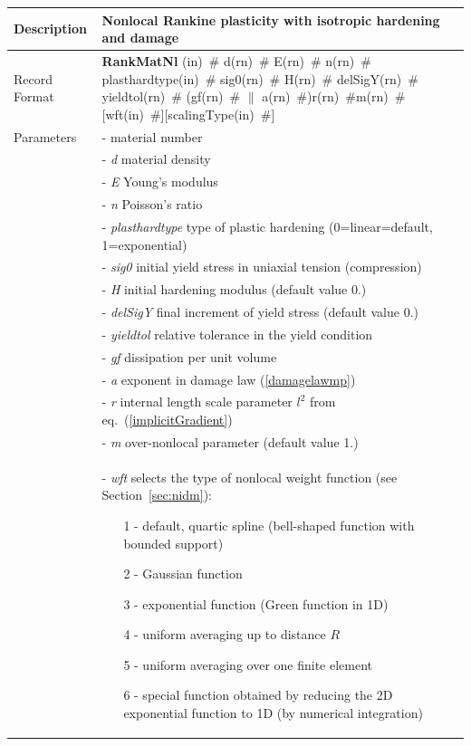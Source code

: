 \documentclass[a4paper]{article}
\newcommand{\descitem}[1]{{\noindent \bf #1}}
\newcommand{\elemparam}[2]{{{#1\tiny (#2)}~\#}}
\newcommand{\param}[1]{{\it #1}}
\newenvironment{mmt}{\begin{tabular}{|l|p{9cm}|}}{\end{tabular}\\}
\newenvironment{mmt}{\begin{tabular}{|l|l|}}{\end{tabular}\\}
\begin{document}
\begin{table}[!htb]
\begin{mmt}
\hline
Description & Nonlocal Rankine plasticity with isotropic hardening and damage\\
\hline
Record Format & \descitem{RankMatNl}  \elemparam{}{in}
\elemparam{d}{rn} \elemparam{E}{rn} \elemparam{n}{rn} \elemparam{plasthardtype}{in} \elemparam{sig0}{rn} \elemparam{H}{rn} \elemparam{delSigY}{rn} \elemparam{yieldtol}{rn} (\elemparam{gf}{rn} $\|$ \elemparam{a}{rn})\elemparam{r}{rn}\elemparam{m}{rn}[\elemparam{wft}{in}][\elemparam{scalingType}{in}] \\
Parameters &- \param{} material number\\
&- \param{d} material density\\
&- \param{E} Young's modulus\\
&- \param{n} Poisson's ratio\\
&- \param{plasthardtype} type of plastic hardening (0=linear=default, 1=exponential)\\
&- \param{sig0} initial yield stress in uniaxial tension (compression)\\
&- \param{H} initial hardening modulus (default value 0.)\\
&- \param{delSigY} final increment of yield stress (default value 0.)\\
&- \param{yieldtol} relative tolerance in the yield condition\\
&- \param{gf} dissipation per unit volume\\
&- \param{a} exponent in damage law (\ref{damagelawmp})\\
&- \param{r} internal length scale parameter $l^2$ from eq.~(\ref{implicitGradient})\\
&- \param{m} over-nonlocal parameter (default value 1.)\\
&- \param{wft} selects the type of nonlocal weight function (see Section~\ref{sec:nidm}):
\begin{itemize}\setlength{\itemsep}{-3pt}
\item[1 -] default, quartic spline (bell-shaped function with bounded support)
\item[2 -] Gaussian function
\item[3 -] exponential function (Green function in 1D)
\item[4 -] uniform averaging up to distance $R$
\item[5 -] uniform averaging over one finite element
\item[6 -] special function obtained by reducing the 2D exponential function to 1D (by numerical integration)

\end{itemize}
\end{mmt}
\end{table}
\end{document}
